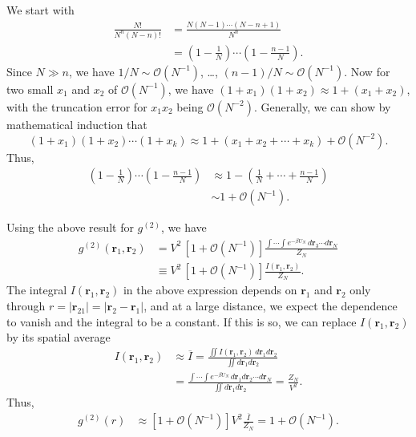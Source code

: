 \documentclass[twocolumn, 10pt]{article}
\numberwithin{equation}{section}
\newenvironment{solution}[1][\empty]
{\par\medskip\sffamily
  \textbf{\ifx\empty#1{Solution.}\relax\else{#1}\fi} \ignorespaces}
{\medskip}
\begin{document}
\begin{solution}
  We start with
  \begin{align*}
    \frac{ N! } { N^n (N-n)! }
    &=
    \frac{ N(N-1)\cdots (N-n+1) }
      { N^n }
    \\
    &=
    \left(1 - \frac{1}{N}\right)
    \cdots
    \left(1 - \frac{n-1}{N}\right).
  \end{align*}
  Since $N \gg n$, we have
  $1/N \sim \mathcal O(N^{-1})$, \dots,
  $(n-1)/N \sim \mathcal O(N^{-1})$.
  Now for two small $x_1$ and $x_2$
  of $\mathcal O(N^{-1})$, we have
  $(1+x_1)(1+x_2) \approx 1 + (x_1+x_2)$,
  with the truncation error for $x_1 x_2$
  being $\mathcal O(N^{-2})$.
  Generally,
  we can show by mathematical induction that
  $$
  (1+x_1)(1+x_2) \cdots (1 + x_k)
  \approx 1 + (x_1+x_2+\cdots + x_k) + \mathcal O(N^{-2}).
  $$
  Thus,
  \begin{align*}
    \left(1 - \frac{1}{N}\right)
    \cdots
    \left(1 - \frac{n-1}{N}\right)
    &\approx
    1-\left(
    \frac{1}{N}
    + \cdots +
    \frac{n-1}{N}
    \right)
    \\
    &\sim
    1 + \mathcal O(N^{-1}).
  \end{align*}

  Using the above result for $g^{(2)}$, we have
  \begin{align*}
    g^{(2)}(\mathbf r_1, \mathbf r_2)
    &=
    V^2 \, [1 + \mathcal O(N^{-1})]
    \frac{
      \int\cdots\int e^{-\beta U_N} \, d\mathbf r_{3}\cdots d\mathbf r_N
    } { Z_N }
    \\
    &\equiv
    V^2 \, [1 + \mathcal O(N^{-1})]
    \frac{ I(\mathbf r_1, \mathbf r_2) } { Z_N }
    .
  \end{align*}
  The integral $I(\mathbf r_1, \mathbf r_2)$
  in the above expression
  depends on $\mathbf r_1$ and $\mathbf r_2$
  only through $r = |\mathbf r_{21}| = |\mathbf r_2 - \mathbf r_1|$,
  and at a large distance,
  we expect the dependence to vanish
  and the integral to be a constant.
  If this is so, we can replace $I(\mathbf r_1, \mathbf r_2)$
  by its spatial average
  \begin{align*}
    I(\mathbf r_1, \mathbf r_2)
    &\approx
    \overline I
    =
    \frac{
      \iint
      I(\mathbf r_1, \mathbf r_2)
      \, d\mathbf r_1 d\mathbf r_2
    }
    { \iint d\mathbf r_1 d\mathbf r_2 }
    \\
    &=
    \frac{
      \int \cdots \int
      e^{-\beta U_N}
      \, d\mathbf r_1 d\mathbf r_2 \cdots d\mathbf r_N
    }
    { \iint d\mathbf r_1 d\mathbf r_2 }
    =
    \frac{ Z_N } { V^2 }
    .
  \end{align*}
  Thus,
  \begin{align*}
    g^{(2)}(r)
    &\approx
    [1 + \mathcal O(N^{-1})]
    V^2
    \frac{ \overline{ I } } { Z_N }
    =
    1 + \mathcal O(N^{-1})
    .
  \end{align*}


\end{solution}
\end{document}

